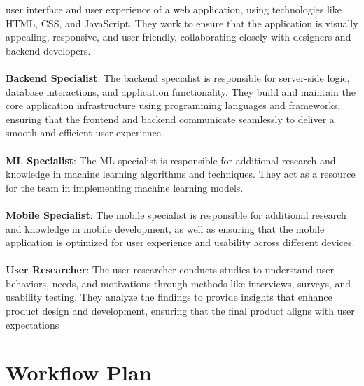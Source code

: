 \documentclass{article}
\begin{document}
user interface and user experience of a web application, using technologies like
HTML, CSS, and JavaScript. They work to ensure that the application is visually
appealing, responsive, and user-friendly, collaborating closely with designers
and backend developers. \\
\\
\textbf{Backend Specialist}: The backend specialist is responsible for
server-side logic, database interactions, and application functionality. They
build and maintain the core application infrastructure using programming
languages and frameworks, ensuring that the frontend and backend communicate
seamlessly to deliver a smooth and efficient user experience. \\
\\
\textbf{ML Specialist}: The ML specialist is responsible for additional
research and knowledge in machine learning algorithms and techniques. They act
as a resource for the team in implementing machine learning models.\\
\\
\textbf{Mobile Specialist}: The mobile specialist is responsible for additional
research and knowledge in mobile development, as well as ensuring that the
mobile application is optimized for user experience and usability across
different devices.\\
\\
\textbf{User Researcher}: The user researcher conducts studies to understand
user behaviors, needs, and motivations through methods like interviews, surveys,
and usability testing. They analyze the findings to provide insights that
enhance product design and development, ensuring that the final product aligns
with user expectations

\newpage

\section{Workflow Plan}
\end{document}
